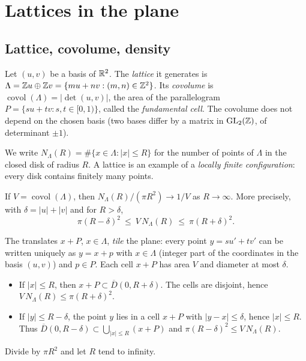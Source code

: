 \section{Lattices in the plane}
\label{ch1:sec:reseaux}

\subsection{Lattice, covolume, density}

\begin{definition}\label{ch1:def:reseau}
Let $(u,v)$ be a basis of $\mathbb{R}^2$. The \emph{lattice} it generates is $\Lambda=\mathbb{Z} u\oplus\mathbb{Z} v=\{mu+nv : (m,n)\in\mathbb{Z}^2\}$.
Its \emph{covolume} is $\operatorname{covol}(\Lambda)=|\det(u,v)|$, the area of the parallelogram
$P=\{su+tv : s,t\in[0,1)\}$, called the \emph{fundamental cell}. The covolume does not depend on the chosen basis
(two bases differ by a matrix in $\mathrm{GL}_2(\mathbb{Z})$, of determinant $\pm1$).
\end{definition}

We write $N_\Lambda(R)=\#\{x\in\Lambda : |x|\le R\}$ for the number of points of $\Lambda$ in the closed disk of radius $R$.
A lattice is an example of a \emph{locally finite configuration}: every disk contains finitely many points.

\begin{proposition}\label{ch1:prop:comptage}
If $V=\operatorname{covol}(\Lambda)$, then $N_\Lambda(R)/(\pi R^2)\to 1/V$ as $R\to\infty$. More precisely, with
$\delta=|u|+|v|$ and for $R>\delta$,
\[
  \pi (R-\delta)^2\ \le\ V\,N_\Lambda(R)\ \le\ \pi (R+\delta)^2 .
\]
\tierC{}
\end{proposition}

\begin{humanproof}
The translates $x+P$, $x\in\Lambda$, \emph{tile} the plane: every point $y=su'+tv'$ can be written uniquely as
$y=x+p$ with $x\in\Lambda$ (integer part of the coordinates in the basis $(u,v)$) and $p\in P$. Each cell
$x+P$ has area $V$ and diameter at most $\delta$.
\begin{itemize}
\item If $|x|\le R$, then $x+P\subset \overline{D}(0,R+\delta)$. The cells are disjoint, hence
$V\,N_\Lambda(R)\le \pi(R+\delta)^2$.
\item If $|y|\le R-\delta$, the point $y$ lies in a cell $x+P$ with $|y-x|\le\delta$, hence $|x|\le R$.
Thus $\overline{D}(0,R-\delta)\subset\bigcup_{|x|\le R}(x+P)$ and $\pi(R-\delta)^2\le V\,N_\Lambda(R)$.
\end{itemize}
Divide by $\pi R^2$ and let $R$ tend to infinity.
\end{humanproof}

